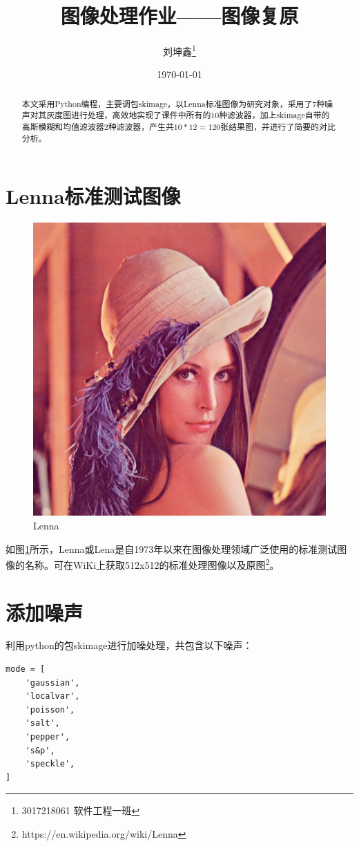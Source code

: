 \documentclass{article}
\begin{document}
\title{图像处理作业——图像复原}
\author{刘坤鑫\thanks{3017218061 软件工程一班}}
\date{\today}
\maketitle
\begin{abstract}
	本文采用Python编程，主要调包skimage，以Lenna标准图像为研究对象，采用了7种噪声对其灰度图进行处理，高效地实现了课件中所有的10种滤波器，加上skimage自带的高斯模糊和均值滤波器2种滤波器，产生共$10*12=120$张结果图，并进行了简要的对比分析。
\end{abstract}

\section{Lenna标准测试图像}

\begin{figure}[ht]
	\centering
	\includegraphics[width=0.6\linewidth]{../code/img/Lena.png}
	\caption{Lenna}
	\label{fig:Lenna}
\end{figure}

如图\ref{fig:Lenna}所示，Lenna或Lena是自1973年以来在图像处理领域广泛使用的标准测试图像的名称。可在WiKi上获取512x512的标准处理图像以及原图\footnote{https://en.wikipedia.org/wiki/Lenna}。

\section{添加噪声}

利用python的包skimage进行加噪处理，共包含以下噪声：

\begin{lstlisting}[title={skimage.util.random\_noise中mode参数设置}]
mode = [
	'gaussian',
	'localvar',
	'poisson',
	'salt',
	'pepper',
	's&p',
	'speckle',
]
\end{lstlisting}
\end{document}

